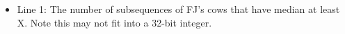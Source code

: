 \begin{itemize}
	\item      Line 1: The number of subsequences of FJ's cows that have median at         least X. Note this may not fit into a 32-bit integer.    
\end{itemize}